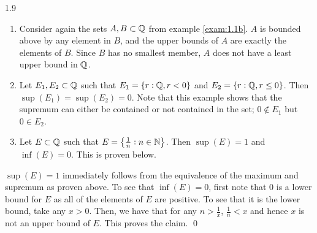 \begin{comment}
\begin{nproof}
    Let $E \subset S$ and $\alpha = \max(E)$. By definition $\alpha$ is an upper bound of $E$, and if $x < \alpha$ for some $x \in E$ then $x$ is not an upper bound of $E$ as it is not greater than $\alpha \in E$. The claim follows (with an identical proof for the minimum). \qed
\end{nproof}
\end{comment}

\begin{example}{}{1.9}
    \begin{enumerate}
        \item Consider again the sets $A, B \subset \mathbb{Q}$ from example \ref{exam:1.1b}. $A$ is bounded above by any element in $B$, and the upper bounds of $A$ are exactly the elements of $B$. Since $B$ has no smallest member, $A$ does not have a least upper bound in $\mathbb{Q}$.
        \item Let $E_1, E_2 \subset \mathbb{Q}$ such that $E_1 = \set{r: \mathbb{Q}, r < 0}$ and $E_2 = \set{r: \mathbb{Q}, r \leq 0}$. Then $\sup(E_1) = \sup(E_2) = 0$. Note that this example shows that the supremum can either be contained or not contained in the set; $0 \notin E_1$ but $0 \in E_2$. 
        \item Let $E \subset \mathbb{Q}$ such that $E = \set{\frac{1}{n}: n \in \mathbb{N}}$. Then $\sup(E) = 1$ and $\inf(E) = 0$. This is proven below. 
    \end{enumerate}
\end{example}
\begin{nproof}
    $\sup(E) = 1$ immediately follows from the equivalence of the maximum and supremum as proven above. To see that $\inf(E) = 0$, first note that $0$ is a lower bound for $E$ as all of the elements of $E$ are positive. To see that it is the lower bound, take any $x > 0$. Then, we have that for any $n > \frac{1}{x}$, $\frac{1}{n} < x$ and hence $x$ is not an upper bound of $E$. This proves the claim. \qed
\end{nproof}

